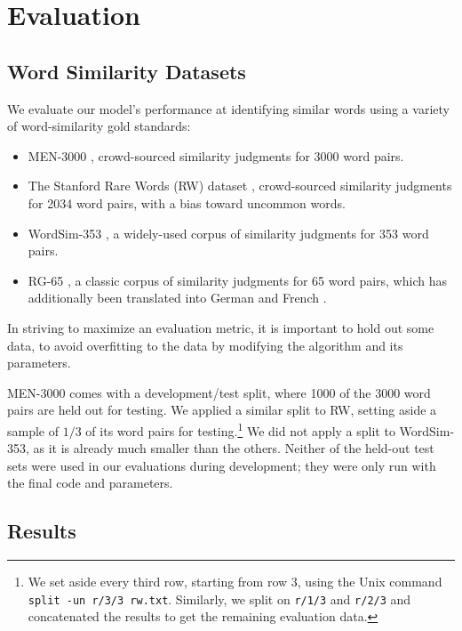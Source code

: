 \documentclass[11pt,letterpaper]{article}
\begin{document}
\section{Evaluation}

\subsection{Word Similarity Datasets}

We evaluate our model's performance at identifying similar words using a
variety of word-similarity gold standards:

\begin{itemize}
\item MEN-3000 \cite{bruni2014men}, crowd-sourced similarity judgments for 3000
    word pairs.
\item The Stanford Rare Words (RW) dataset \cite{luong2013rw}, crowd-sourced
    similarity judgments for 2034 word pairs, with a bias toward uncommon words.
\item WordSim-353 \cite{finkelstein2001ws}, a widely-used corpus of similarity
    judgments for 353 word pairs.
\item RG-65 \cite{rubenstein1965rg}, a classic corpus of similarity judgments
    for 65 word pairs, which has additionally been translated into German
    \cite{gurevych2005german} and French \cite{joubarne2011french}.
\end{itemize}

In striving to maximize an evaluation metric, it is important to hold out some
data, to avoid overfitting to the data by modifying the algorithm and its
parameters.

MEN-3000 comes with a development/test split, where 1000 of the 3000 word pairs
are held out for testing. We applied a similar split to RW, setting aside a
sample of $1/3$ of its word pairs for testing.\footnote{
    We set aside every third row, starting from row 3, using the Unix command
    {\tt split -un r/3/3 rw.txt}. Similarly, we split on {\tt r/1/3} and
    {\tt r/2/3} and concatenated the results to get the remaining evaluation
    data.
} We did not apply a split to WordSim-353, as it is already much smaller than
the others. Neither of the held-out test sets were used in our evaluations
during development; they were only run with the final code and parameters.

\subsection{Results}
\end{document}
